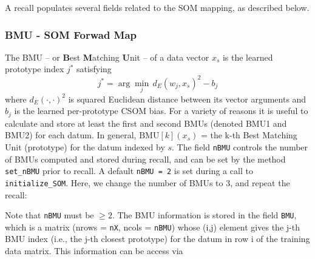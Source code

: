 \documentclass[]{article}
\newenvironment{Shaded}{\begin{snugshade}}{\end{snugshade}}
\newcommand{\CommentTok}[1]{\textcolor[rgb]{0.56,0.35,0.01}{\textit{#1}}}
\newcommand{\DecValTok}[1]{\textcolor[rgb]{0.00,0.00,0.81}{#1}}
\newcommand{\KeywordTok}[1]{\textcolor[rgb]{0.13,0.29,0.53}{\textbf{#1}}}
\newcommand{\NormalTok}[1]{#1}
\newcommand{\OperatorTok}[1]{\textcolor[rgb]{0.81,0.36,0.00}{\textbf{#1}}}
\begin{document}
A recall populates several fields related to the SOM mapping, as described below.

\hypertarget{bmu---som-forwad-map}{%
\subsubsection{BMU - SOM Forwad Map}\label{bmu---som-forwad-map}}

The BMU -- or \textbf{B}est \textbf{M}atching \textbf{U}nit -- of a data vector \(x_s\) is the learned prototype index \(j^*\) satisfying
\[ j^* = \arg\min_{j} \, d_E(w_j, x_s)^2 - b_j\]
where \(d_E(\cdot,\cdot)^2\) is squared Euclidean distance between its vector arguments and \(b_j\) is the learned per-prototype CSOM bias. For a variety of reasons it is useful to calculate and store at least the first and second BMUs (denoted BMU1 and BMU2) for each datum. In general, \(\text{BMU}[k](x_s)\) = the k-th Best Matching Unit (prototype) for the datum indexed by \(s\). The field \texttt{nBMU} controls the number of BMUs computed and stored during recall, and can be set by the method \texttt{set\_nBMU} prior to recall. A default \texttt{nBMU\ =\ 2} is set during a call to \texttt{initialize\_SOM}. Here, we change the number of BMUs to 3, and repeat the recall:

\begin{Shaded}
\end{Shaded}

Note that \texttt{nBMU} must be \(\geq 2\). The BMU information is stored in the field \texttt{BMU}, which is a matrix (nrows = \texttt{nX}, ncols = \texttt{nBMU}) whose (i,j) element gives the j-th BMU index (i.e., the j-th closest prototype) for the datum in row i of the training data matrix. This information can be access via

\begin{Shaded}
\end{Shaded}
\end{document}
